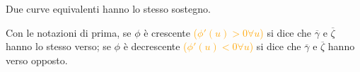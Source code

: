 \begin{attbar}
	Due curve equivalenti hanno lo stesso sostegno.
\end{attbar}


\begin{definition}
	Con le notazioni di prima, se $\phi$ è crescente \textcolor{orange}{($\phi'(u)>0 \forall u$)} si dice che $\overline{\gamma}$ e $\overline{\zeta}$ hanno lo stesso verso; se $\phi$ è decrescente \textcolor{orange}{($\phi'(u)<0 \forall u $)} si dice che $\overline{\gamma}$ e $\overline{\zeta}$ hanno verso opposto.\\

	\segnaposto %
\end{definition}



\begin{comment}
	
	
	\paragraph{\textcolor{red}{Esempio}}
	$\overline{\gamma}(t)=(\cos t, \sin t)$, $t\in [0,2\pi]$, il sostegno è la circonferenza di centro $(0,0)$ e raggio $1$ ed è percorsa una volta  in senso antiorario. $\phi(u)=2u$, $u\in [o,\pi]$, $\phi(u)\in[0,2\pi]$; $\overline{\zeta}(u)=\overline{\gamma}(\phi(u))=(\cos (2u),\sin (2u))$, $u \in [0,\pi]$ è curva equivalente \textcolor{orange}{(percorre la stessa circonferenza a velocità doppia)}.\\
	$\psi(u)=2u$, $u \in [0, 2\pi]$, $\overline{\mu}(u)=\overline{\gamma}(\psi(u))=(\cos(2u), \sin (2u))$, $u \in [0,2\pi]$ non è equivalente a $\overline{\gamma}$ \textcolor{orange}{(percorre la circonferenza due volte)}. Infatti $\psi$ non è invertibile\textcolor{orange}{, cioè iniettiva e suriettiva,} come funzione da $[0,2\pi]$ in $[0,2\pi]$. Nel nostro caso si ha infatti $\psi ([0,2\pi])=[0,4\pi]$, $\mu (u)=2\pi-u$, $u \in [0,2\pi]$.\\
	$\overline{\nu}(u)=\overline{\gamma}(\mu(u))=(\cos(2\pi-u),\sin(2\pi-u))$ \textcolor{orange}{ la circonferenza è percorsa una volta in senso orario} $\overline{\gamma}$ e $\overline{\nu}$ sono curve equivalenti di verso opposto ($\mu$ è decrescente).
	

\end{comment}

